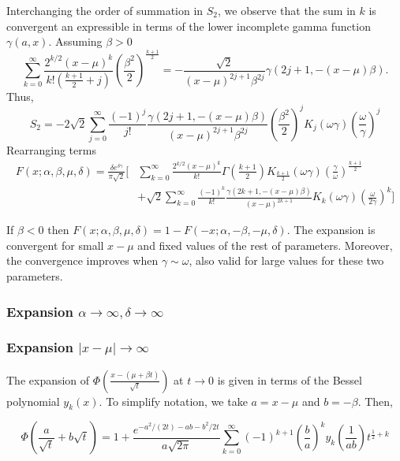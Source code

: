 \documentclass[10pt,a4paper,oneside]{article}
\numberwithin{equation}{section}
\begin{document}
Interchanging the order of summation in $S_2$, we observe that the sum in $k$ is convergent an expressible in terms of the lower incomplete gamma function $\gamma(a, x)$. Assuming $\beta > 0$
\begin{equation}
\sum_{k=0}^{\infty}\frac{2^{k/2}(x-\mu)^k}{k! (\frac{k+1}{2}+ j)} \left(\frac{\beta^2}{2}\right)^{\frac{k+1}{2}} = -\frac{\sqrt{2}}{(x-\mu)^{2j+1}\beta^{2j}} \gamma \left(2j + 1, -(x-\mu)\beta\right).
\end{equation}
Thus,
\begin{equation*}
S_2 = -2\sqrt{2} \sum_{j=0}^{\infty} \frac{(-1)^j}{j!}\frac{\gamma \left(2j + 1, -(x-\mu)\beta\right)}{(x-\mu)^{2j+1}\beta^{2j}} \left(\frac{\beta^2}{2}\right)^j  K_j(\omega \gamma) \left(\frac{\omega}{\gamma}\right)^j
\end{equation*}
Rearranging terms
\begin{align}
F(x;\alpha, \beta, \mu, \delta) = \frac{\delta e^{\delta \gamma}}{\pi \sqrt{2}} \bigg[& \sum_{k=0}^{\infty}\frac{2^{k/2}(x-\mu)^k}{k!} \Gamma\left(\frac{k+1}{2}\right) K_{\frac{k+1}{2}}(\omega \gamma) \left(\frac{\gamma}{\omega}\right)^{\frac{k+1}{2}}\nonumber\\
& + \sqrt{2}\sum_{k=0}^{\infty} \frac{(-1)^k}{k!}\frac{\gamma \left(2k + 1, -(x-\mu)\beta\right)}{(x-\mu)^{2k+ 1}}  K_k(\omega \gamma) \left(\frac{\omega}{2\gamma}\right)^k \bigg]
\end{align}

If $\beta < 0$ then $F(x;\alpha, \beta, \mu, \delta) = 1 - F(-x;\alpha, -\beta, -\mu, \delta)$. The expansion is convergent for small $x-\mu$ and fixed values of the rest of parameters. Moreover, the convergence improves when $\gamma \sim \omega$, also valid for large values for these two parameters.

\subsubsection{Expansion $\alpha \to \infty, \delta \to \infty$}

\subsubsection{Expansion $|x-\mu| \to \infty$}

The expansion of $\Phi\left(\frac{x-(\mu + \beta t)}{\sqrt{t}}\right)$ at $t\to 0$ is given in terms of the Bessel polynomial $y_k(x)$. To simplify notation, we take $a = x-\mu$ and $b=-\beta$. Then,

\begin{equation}
\Phi\left(\frac{a}{\sqrt{t}} + b\sqrt{t}\right) = 1 + \frac{e^{-a^2/(2t) -ab - b^2/2 t}}{a\sqrt{2\pi}}\sum_{k=0}^{\infty} (-1)^{k+1} \left(\frac{b}{a}\right)^k y_k\left(\frac{1}{ab}\right) t^{\frac{1}{2} + k}
\end{equation}
\end{document}
